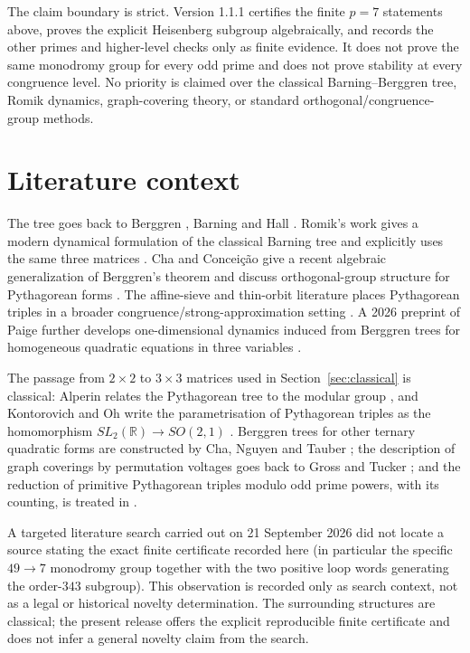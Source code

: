 \documentclass[11pt]{article}
\begin{document}
The claim boundary is strict. Version 1.1.1 certifies the finite $p=7$ statements above, proves the explicit Heisenberg subgroup algebraically, and records the other primes and higher-level checks only as finite evidence. It does not prove the same monodromy group for every odd prime and does not prove stability at every congruence level. No priority is claimed over the classical Barning--Berggren tree, Romik dynamics, graph-covering theory, or standard orthogonal/congruence-group methods.

\section{Literature context}
The tree goes back to Berggren \cite{Berggren1934}, Barning \cite{Barning1963} and Hall \cite{Hall1970}.  Romik's work gives a modern dynamical formulation of the classical Barning tree and explicitly uses the same three matrices \cite{Romik2008}.  Cha and Concei\c{c}\~ao give a recent algebraic generalization of Berggren's theorem and discuss orthogonal-group structure for Pythagorean forms \cite{ChaConceicao2023}.  The affine-sieve and thin-orbit literature places Pythagorean triples in a broader congruence/strong-approximation setting \cite{BGS2010,Ehrman2019}.  A 2026 preprint of Paige further develops one-dimensional dynamics induced from Berggren trees for homogeneous quadratic equations in three variables \cite{Paige2026}.

The passage from $2\times2$ to $3\times3$ matrices used in Section~\ref{sec:classical} is classical: Alperin relates the Pythagorean tree to the modular group \cite{Alperin2005}, and Kontorovich and Oh write the parametrisation of Pythagorean triples as the homomorphism $SL_2(\mathbb{R})\to SO(2,1)$ \cite{KO2012}.  Berggren trees for other ternary quadratic forms are constructed by Cha, Nguyen and Tauber \cite{CNT2018}; the description of graph coverings by permutation voltages goes back to Gross and Tucker \cite{GT1977}; and the reduction of primitive Pythagorean triples modulo odd prime powers, with its counting, is treated in \cite{Biddle2026}.

A targeted literature search carried out on 21 September 2026 did not locate a source stating the exact finite certificate recorded here (in particular the specific $49\to7$ monodromy group together with the two positive loop words generating the order-$343$ subgroup).  This observation is recorded only as search context, not as a legal or historical novelty determination.  The surrounding structures are classical; the present release offers the explicit reproducible finite certificate and does not infer a general novelty claim from the search.
\end{document}
